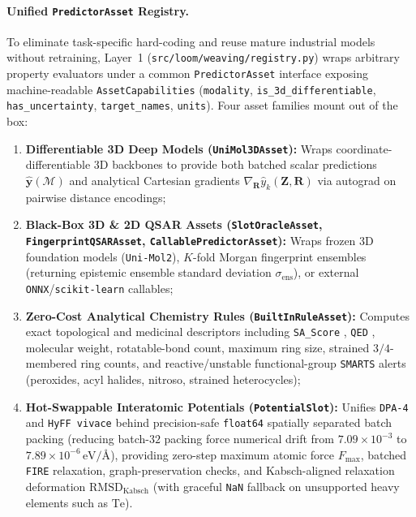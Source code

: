 \documentclass[11pt,a4paper]{article}
\begin{document}
\paragraph{Unified \texttt{PredictorAsset} Registry.}
To eliminate task-specific hard-coding and reuse mature industrial models without retraining, Layer~1 (\texttt{src/loom/weaving/registry.py}) wraps arbitrary property evaluators under a common \texttt{PredictorAsset} interface exposing machine-readable \texttt{AssetCapabilities} (\texttt{modality}, \texttt{is\_3d\_differentiable}, \texttt{has\_uncertainty}, \texttt{target\_names}, \texttt{units}). Four asset families mount out of the box:
\begin{enumerate}[leftmargin=1.6em,itemsep=1pt,topsep=2pt]
    \item \textbf{Differentiable 3D Deep Models (\texttt{UniMol3DAsset}):} Wraps coordinate-differentiable 3D backbones \citep{zhou2023unimol} to provide both batched scalar predictions $\hat{\mathbf{y}}(\mathcal{M})$ and analytical Cartesian gradients $\nabla_{\mathbf{R}}\hat{y}_k(\mathbf{Z}, \mathbf{R})$ via autograd on pairwise distance encodings;
    \item \textbf{Black-Box 3D \& 2D QSAR Assets (\texttt{SlotOracleAsset}, \texttt{FingerprintQSARAsset}, \texttt{CallablePredictorAsset}):} Wraps frozen 3D foundation models (\texttt{Uni-Mol2}), $K$-fold Morgan fingerprint ensembles (returning epistemic ensemble standard deviation $\sigma_{\text{ens}}$), or external \texttt{ONNX}/\texttt{scikit-learn} callables;
    \item \textbf{Zero-Cost Analytical Chemistry Rules (\texttt{BuiltInRuleAsset}):} Computes exact topological and medicinal descriptors including \texttt{SA\_Score} \citep{ertl2009sa}, \texttt{QED} \citep{bickerton2012qed}, molecular weight, rotatable-bond count, maximum ring size, strained $3/4$-membered ring counts, and reactive/unstable functional-group \texttt{SMARTS} alerts (peroxides, acyl halides, nitroso, strained heterocycles);
    \item \textbf{Hot-Swappable Interatomic Potentials (\texttt{PotentialSlot}):} Unifies \texttt{DPA-4} \citep{deepmodeling2026dpa4} and \texttt{HyFF vivace} \citep{hyra2026hyff} behind precision-safe \texttt{float64} spatially separated batch packing (reducing batch-$32$ packing force numerical drift from $7.09 \times 10^{-3}$ to $7.89 \times 10^{-6}\,\text{eV/\AA}$), providing zero-step maximum atomic force $F_{\max}$, batched \texttt{FIRE} relaxation, graph-preservation checks, and Kabsch-aligned relaxation deformation $\text{RMSD}_{\text{Kabsch}}$ (with graceful \texttt{NaN} fallback on unsupported heavy elements such as $\text{Te}$).
\end{enumerate}
\end{document}
